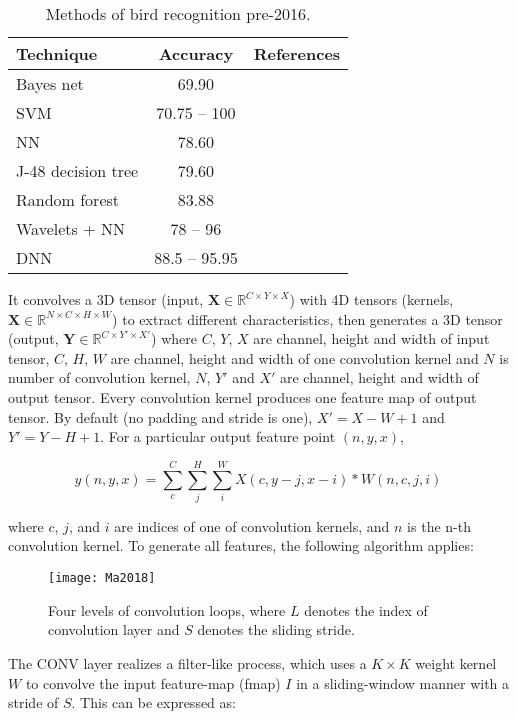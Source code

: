 
\begin{table}
\renewcommand{\arraystretch}{.75}
\caption{Methods of bird recognition pre-2016.}
\centering
\small
\begin{tabular}{|l|c|c|}
\hline
\textbf{Technique}	&  \textbf{Accuracy} & \textbf{References} \\
\hline
Bayes net			& 69.90 			& \cite{Raghuram2016} \\
SVM 				& 70.75 -- 100 	& \cite{Raghuram2016}\cite{Zhao2017}\cite{Knapp2016} \\
NN 					& 78.60 			& \cite{Raghuram2016} \\
J-48 decision tree 	& 79.60 			& \cite{Raghuram2016} \\
Random forest 		& 83.88 			& \cite{Raghuram2016} \\
Wavelets + NN 		& 78 -- 96 		& \cite{Selin2007} \\
DNN 					& 88.5 -- 95.95	& \cite{Xie2019}\cite{Cakir2017} \\
\hline
\end{tabular}
\end{table}

It convolves a 3D tensor (input, $\mathbf{X}\in \mathbb{R}^{C\times Y\times X}$) with 4D tensors (kernels, $\mathbf{X}\in \mathbb{R}^{N\times C\times H\times W}$) to extract different characteristics, then generates a 3D tensor (output, $\mathbf{Y}\in \mathbb{R}^{C\times Y'\times X'}$) where $C$, $Y$, $X$ are channel, height and width of input tensor, $C$, $H$, $W$ are channel, height and width of one convolution kernel and $N$ is number of convolution kernel, $N$, $Y'$ and $X'$ are channel, height and width of output tensor. Every convolution kernel produces one feature map of output tensor. By default (no padding and stride is one), $X' = X-W+1$ and $Y'=Y-H+1$. For a particular output feature point $(n,y,x)$, 

\[
y(n,y,x) = \sum^C_c\sum^H_j\sum^W_i X(c,y-j,x-i)*W(n,c,j,i)\
\]

\noindent
where $c$, $j$, and $i$ are indices of one of convolution kernels, and $n$ is the n-th convolution kernel. To generate all features, the following algorithm applies:

\begin{figure}[H]
\texttt{[image: Ma2018]}
\caption{Four levels of convolution loops, where $L$ denotes the index of convolution layer and $S$ denotes the sliding stride. }
\end{figure}

The CONV layer realizes a filter-like process,  which uses a  $K \times K$ weight kernel $W$ to convolve the input feature-map (fmap) $I$ in a sliding-window manner with a stride of $S$. This can be expressed as:

